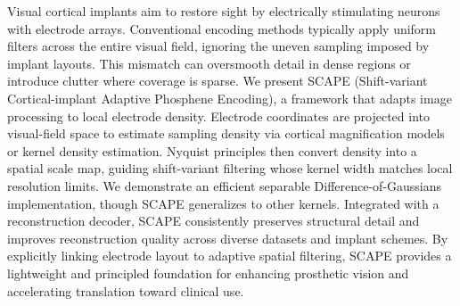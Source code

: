 Visual cortical implants aim to restore sight by electrically stimulating neurons with electrode arrays. Conventional encoding methods typically apply uniform filters across the entire visual field, ignoring the uneven sampling imposed by implant layouts. This mismatch can oversmooth detail in dense regions or introduce clutter where coverage is sparse. We present SCAPE (Shift-variant Cortical-implant Adaptive Phosphene Encoding), a framework that adapts image processing to local electrode density. Electrode coordinates are projected into visual-field space to estimate sampling density via cortical magnification models or kernel density estimation. Nyquist principles then convert density into a spatial scale map, guiding shift-variant filtering whose kernel width matches local resolution limits. We demonstrate an efficient separable Difference-of-Gaussians implementation, though SCAPE generalizes to other kernels. Integrated with a reconstruction decoder, SCAPE consistently preserves structural detail and improves reconstruction quality across diverse datasets and implant schemes. By explicitly linking electrode layout to adaptive spatial filtering, SCAPE provides a lightweight and principled foundation for enhancing prosthetic vision and accelerating translation toward clinical use.